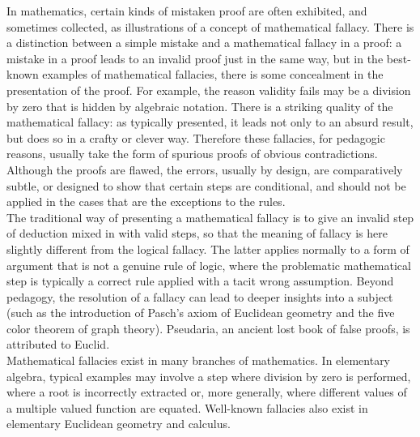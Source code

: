 \documentclass[mmath,12pt]{unswthesis}   %
\numberwithin{equation}{section}
\begin{document}
In mathematics, certain kinds of mistaken proof are often exhibited, and sometimes collected, as illustrations of a concept of mathematical fallacy. There is a distinction between a simple mistake and a mathematical fallacy in a proof: a mistake in a proof leads to an invalid proof just in the same way, but in the best-known examples of mathematical fallacies, there is some concealment in the presentation of the proof. For example, the reason validity fails may be a division by zero that is hidden by algebraic notation. There is a striking quality of the mathematical fallacy: as typically presented, it leads not only to an absurd result, but does so in a crafty or clever way. Therefore these fallacies, for pedagogic reasons, usually take the form of spurious proofs of obvious contradictions. Although the proofs are flawed, the errors, usually by design, are comparatively subtle, or designed to show that certain steps are conditional, and should not be applied in the cases that are the exceptions to the rules. \\

\noindent The traditional way of presenting a mathematical fallacy is to give an invalid step of deduction mixed in with valid steps, so that the meaning of fallacy is here slightly different from the logical fallacy. The latter applies normally to a form of argument that is not a genuine rule of logic, where the problematic mathematical step is typically a correct rule applied with a tacit wrong assumption. Beyond pedagogy, the resolution of a fallacy can lead to deeper insights into a subject (such as the introduction of Pasch's axiom of Euclidean geometry and the five color theorem of graph theory). Pseudaria, an ancient lost book of false proofs, is attributed to Euclid. \\

\noindent Mathematical fallacies exist in many branches of mathematics. In elementary algebra, typical examples may involve a step where division by zero is performed, where a root is incorrectly extracted or, more generally, where different values of a multiple valued function are equated. Well-known fallacies also exist in elementary Euclidean geometry and calculus.






\clearpage
{}

\end{document}
